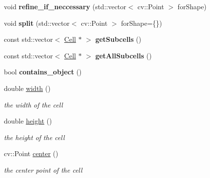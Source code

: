 \begin{DoxyCompactItemize}
void {\bfseries refine\+\_\+if\+\_\+neccessary} (std\+::vector$<$ cv\+::\+Point $>$ for\+Shape)
\item 
\mbox{\label{class_cell_a04ec4b7bd84e8ae7ff1d014a3d9741ed}} 
void {\bfseries split} (std\+::vector$<$ cv\+::\+Point $>$ for\+Shape=\{\})
\item 
\mbox{\label{class_cell_a1e0b427a67335cf9995f0017963f7683}} 
const std\+::vector$<$ \mbox{\hyperlink{class_cell}{Cell}} $\ast$ $>$ {\bfseries get\+Subcells} ()
\item 
\mbox{\label{class_cell_ae076e3a10da38a11957987dbc53050cc}} 
const std\+::vector$<$ \mbox{\hyperlink{class_cell}{Cell}} $\ast$ $>$ {\bfseries get\+All\+Subcells} ()
\item 
\mbox{\label{class_cell_a7182bd8459f98bafdec19697e283a06a}} 
bool {\bfseries contains\+\_\+object} ()
\item 
\mbox{\label{class_cell_a135d14fca8f8e3c241b3e7d39df90383}} 
double \mbox{\hyperlink{class_cell_a135d14fca8f8e3c241b3e7d39df90383}{width}} ()
\begin{DoxyCompactList}\small\item\em the width of the cell \end{DoxyCompactList}\item 
\mbox{\label{class_cell_a18272b1b5b9a3dc9eb8e5be7cf7de10a}} 
double \mbox{\hyperlink{class_cell_a18272b1b5b9a3dc9eb8e5be7cf7de10a}{height}} ()
\begin{DoxyCompactList}\small\item\em the height of the cell \end{DoxyCompactList}\item 
\mbox{\label{class_cell_ae8141ce63b441afa2bb75d4f86aef38e}} 
cv\+::\+Point \mbox{\hyperlink{class_cell_ae8141ce63b441afa2bb75d4f86aef38e}{center}} ()
\begin{DoxyCompactList}\small\item\em the center point of the cell \end{DoxyCompactList}\item 
\mbox{\label{class_cell_a136f724c1730f551b7533f5840c9c393}} 

\end{DoxyCompactItemize}
